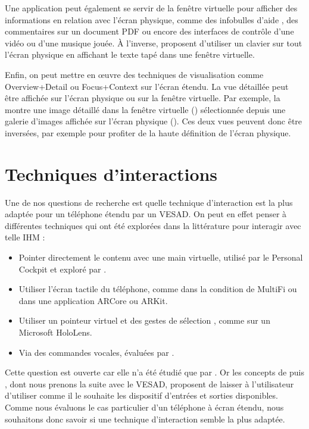 Une application peut également se servir de la fenêtre virtuelle pour afficher des informations en relation avec l'écran physique, comme des infobulles d'aide , des commentaires sur un document PDF ou encore des interfaces de contrôle d'une vidéo ou d'une musique jouée. À l'inverse, \cite{Grubert2015} proposent d'utiliser un clavier sur tout l'écran physique en affichant le texte tapé dans une fenêtre virtuelle.

Enfin, on peut mettre en \oe uvre des techniques de visualisation comme Overview+Detail ou Focus+Context sur l'écran étendu. La vue détaillée peut être affichée sur l'écran physique ou sur la fenêtre virtuelle. Par exemple, la  montre une image détaillé dans la fenêtre virtuelle () sélectionnée depuis une galerie d'images affichée sur l'écran physique (). Ces deux vues peuvent donc être inversées, par exemple pour profiter de la haute définition de l'écran physique.


\section{Techniques d'interactions}
\label{sec:concept_interaction_techniques}

Une de nos questions de recherche  est quelle technique d'interaction est la plus adaptée pour un téléphone étendu par un VESAD. On peut en effet penser à différentes techniques qui ont été explorées dans la littérature pour interagir avec telle IHM :

\begin{itemize}
  \item Pointer directement le contenu avec une main virtuelle, utilisé par le Personal Cockpit \cite{Ens2014} et exploré par \cite{Piumsomboon2013}.
  \item Utiliser l'écran tactile du téléphone, comme dans la condition  de MultiFi \citep{Grubert2015} ou dans une application ARCore ou ARKit.
  \item Utiliser un pointeur virtuel et des gestes de sélection \cite{Wilson2006}, comme sur un Microsoft HoloLens.
  \item Via des commandes vocales, évaluées par \cite{Piumsomboon2014}.
\end{itemize}
\bigskip

Cette question est ouverte car elle n'a été étudié que par \cite{Grubert2015}. Or les concepts de \cite{Serrano2015} puis \cite{Serrano2015a}, dont nous prenons la suite avec le VESAD, proposent de laisser à l'utilisateur d'utiliser comme il le souhaite les dispositif d'entrées et sorties disponibles. Comme nous évaluons le cas particulier d'un téléphone à écran étendu, nous souhaitons donc savoir si une technique d'interaction semble la plus adaptée.

